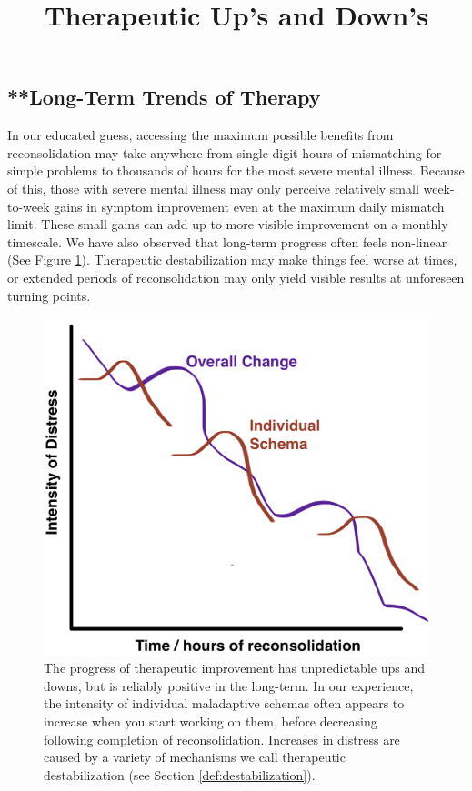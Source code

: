 \documentclass[12pt,letterpaper]{book}
\begin{document}
\subsection{**Long-Term Trends of Therapy}
In our educated guess, accessing the maximum possible benefits from reconsolidation may take anywhere from single digit hours of mismatching for simple problems to thousands of hours for the most severe mental illness. Because of this, those with severe mental illness may only perceive relatively small week-to-week gains in symptom improvement even at the maximum daily mismatch limit. These small gains can add up to more visible improvement on a monthly timescale. We have also observed that long-term progress often feels non-linear (See Figure \ref{fig:ups-downs}). Therapeutic destabilization may make things feel worse at times, or extended periods of reconsolidation may only yield visible results at unforeseen turning points.
\begin{figure}
    \centering
    \title{Therapeutic Up's and Down's}
    \includegraphics[width=1\textwidth]{long-term ups and downs.jpg}
    \caption{The progress of therapeutic improvement has unpredictable ups and downs, but is reliably positive in the long-term. In our experience, the intensity of individual maladaptive schemas often appears to increase when you start working on them, before decreasing following completion of reconsolidation. Increases in distress are caused by a variety of mechanisms we call therapeutic destabilization (see Section \ref{def:destabilization}).}
    \label{fig:ups-downs}
\end{figure}
\FloatBarrier
\end{document}
